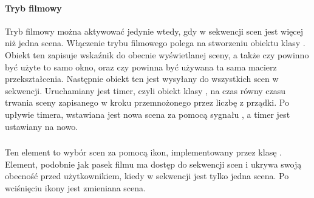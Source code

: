 \paragraph*{Tryb filmowy}

\par
Tryb filmowy można aktywować jedynie wtedy, gdy w sekwencji scen jest więcej niż jedna scena.
Włączenie trybu filmowego polega na stworzeniu obiektu klasy .
Obiekt ten zapisuje wskaźnik do obecnie wyświetlanej sceny, a także czy powinno być użyte to samo okno, oraz czy powinna być używana ta sama macierz przekształcenia.
Następnie obiekt ten jest wysyłany do wszystkich scen w sekwencji.
Uruchamiany jest timer, czyli obiekt klasy , na czas równy czasu trwania sceny zapisanego w kroku przemnożonego przez liczbę z prządki.
Po upływie timera, wstawiana jest nowa scena za pomocą sygnału , a timer jest ustawiany na nowo.

\subsubsection{}
\label{sec:sokar-framechooser}

Ten element to wybór scen za pomocą ikon, implementowany przez klasę .
Element, podobnie jak pasek filmu ma dostęp do sekwencji scen i ukrywa swoją obecność przed użytkownikiem, kiedy w sekwencji jest tylko jedna scena.
Po wciśnięciu ikony jest zmieniana scena.